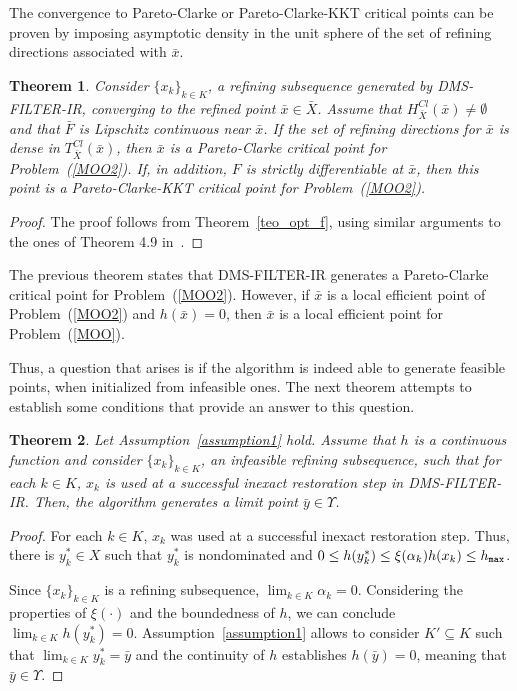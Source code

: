 \documentclass[12pt]{article}
\newtheorem{theorem}{Theorem}[section]
\begin{document}
The convergence to Pareto-Clarke or Pareto-Clarke-KKT critical
points can be proven by imposing asymptotic density in the unit
sphere of the set of refining directions associated with
$\bar{x}$.

\begin{theorem}
\label{opt_f} Consider $\{x_k\}_{k\in K}$, a refining subsequence
generated by DMS-FILTER-IR, converging to the refined point
$\bar{x}\in \bar{X}$. Assume that
$H_{\bar{X}}^{Cl}(\bar{x})\neq\emptyset$ and that $\bar{F}$ is
Lipschitz continuous near $\bar{x}$. If the set of refining
directions for $\bar{x}$ is dense in $T^{Cl}_{\bar{X}}(\bar{x})$,
then $\bar{x}$ is a Pareto-Clarke critical point for
Problem~(\ref{MOO2}). If, in addition, $F$ is strictly
differentiable at $\bar{x}$, then this point is a
Pareto-Clarke-KKT critical point for Problem~(\ref{MOO2}).
\end{theorem}
\begin{proof}
The proof follows from Theorem~\ref{teo_opt_f}, using similar
arguments to the ones of Theorem 4.9 in~\cite{custodio2011}.
\end{proof}

The previous theorem states that DMS-FILTER-IR generates a
Pareto-Clarke critical point for Problem~(\ref{MOO2}). However, if
$\bar{x}$ is a local efficient point of Problem~(\ref{MOO2}) and
$h(\bar{x})=0$, then $\bar{x}$ is a local efficient point for
Problem~(\ref{MOO}).

Thus, a question that arises is if the algorithm is indeed able to
generate feasible points, when initialized from infeasible ones.
The next theorem attempts to establish some conditions that
provide an answer to this question.

\begin{theorem}
Let Assumption~\ref{assumption1} hold. Assume that $h$ is a
continuous function and consider $\{x_k\}_{k\in K}$, an infeasible
refining subsequence, such that for each $k\in K$, $x_k$ is used
at a successful inexact restoration step in DMS-FILTER-IR. Then,
the algorithm generates a limit point $\bar{y}\in \Upsilon$.
\end{theorem}
\begin{proof}
For each $k\in K$, $x_k$ was used at a successful inexact
restoration step. Thus, there is $y_k^*\in X$ such that $y_k^*$ is
nondominated and $0\leq h(y_k^*)\leq \xi(\alpha_k)h(x_k)\leq
h_{\tt max}$.

Since $\{x_k\}_{k\in K}$ is a refining subsequence, $\lim_{k\in
K}\alpha_k=0$. Considering the properties of $\xi(\cdot)$ and the
boundedness of $h$, we can conclude $\lim_{k\in K}h(y_k^*)=0$.
Assumption~\ref{assumption1} allows to consider $K'\subseteq K$
such that $\lim_{k\in K}y_k^*=\bar{y}$ and the continuity of $h$
establishes $h(\bar{y})=0$, meaning that $\bar{y}\in \Upsilon$.
\end{proof}
\end{document}
